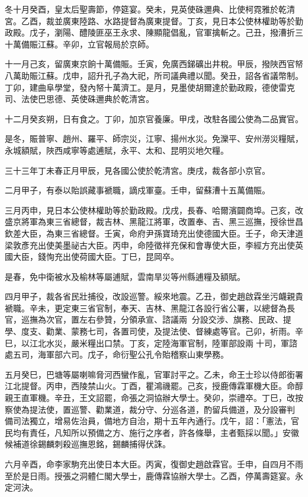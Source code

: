 \begin{pinyinscope}
冬十月癸酉，皇太后聖壽節，停筵宴。癸未，見英使硃邇典、比使柯霓雅於乾清宮。乙酉，裁並廣東陸路、水路提督為廣東提督。丁亥，見日本公使林權助等於勤政殿。戊子，瀏陽、醴陵匪巫王永求、陳顯龍倡亂，官軍擒斬之。己丑，撥漕折三十萬備賑江蘇。辛卯，立官報局於京師。

十一月己亥，留廣東京餉十萬備賑。壬寅，免廣西銻礦出井稅。甲辰，撥陜西官帑八萬助賑江蘇。戊申，詔升孔子為大祀，所司議典禮以聞。癸丑，詔各省議幣制。丁卯，建曲阜學堂，發內帑十萬濟工。是月，見墨使胡爾達於勤政殿，德使雷克司、法使巴思德、英使硃邇典於乾清宮。

十二月癸亥朔，日有食之。丁卯，加京官養廉。甲戌，改駐各國公使為二品實官。

是冬，賑普寧、趙州、羅平、師宗災，江寧、揚州水災。免灤平、安州澇災糧賦，永城額賦，陜西咸寧等處逋賦，永平、太和、昆明災地欠糧。

三十三年丁未春正月甲辰，見各國公使於乾清宮。庚戌，裁各部小京官。

二月甲子，有泰以貽誤藏事褫職，謫戍軍臺。壬申，留蘇漕十五萬備賑。

三月丙申，見日本公使林權助等於勤政殿。戊戌，長春、哈爾濱闢商埠。己亥，改盛京將軍為東三省總督，裁吉林、黑龍江將軍，改置奉、吉、黑三巡撫，授徐世昌欽差大臣，為東三省總督。壬寅，命府尹孫寶琦充出使德國大臣。壬子，命天津道梁敦彥充出使美墨祕古大臣。丙申，命陸徵祥充保和會專使大臣，李經方充出使英國大臣，錢恂充出使荷國大臣。丁巳，昆岡卒。

是春，免中衛被水及榆林等屬逋賦，雲南旱災等州縣逋糧及額賦。

四月甲子，裁各省民壯捕役，改設巡警。綏來地震。乙丑，御史趙啟霖坐污衊親貴褫職。辛未，更定東三省官制，奉天、吉林、黑龍江各設行省公署，以總督為長官，巡撫為次官，置左右參贊，分領承宣、諮議兩，分設交涉、旗務、民政、提學、度支、勸業、蒙務七司，各置司使，及提法使、督練處等官。己卯，祈雨。辛巳，以江北水災，嚴米糧出口禁。丁亥，定陸海軍官制，陸軍部設兩十司，軍諮處五司，海軍部六司。戊子，命衍聖公孔令貽稽察山東學務。

五月癸巳，巴塘等屬喇嘛脅河西蠻作亂，官軍討平之。乙未，命王士珍以侍郎銜署江北提督。丙申，西陵禁山火。丁酉，瞿鴻禨罷。己亥，授鹿傳霖軍機大臣。命醇親王直軍機。辛丑，王文詔罷，命張之洞協辦大學士。癸卯，崇禮卒。丁巳，改按察使為提法使，置巡警、勸業道，裁分守、分巡各道，酌留兵備道，及分設審判，備司法獨立，增易佐治員，備地方自治，期十五年內通行。戊午，詔：「憲法，官民均有責任，凡知所以預備之方、施行之序者，許各條舉，主者甄採以聞。」安徽候補道徐錫麟刺殺巡撫恩銘，錫麟捕得伏誅。

六月辛酉，命李家駒充出使日本大臣。丙寅，復御史趙啟霖官。壬申，自四月不雨至於是日雨。授張之洞體仁閣大學士，鹿傳霖協辦大學士。乙酉，停萬壽筵宴。永定河決。


\end{pinyinscope}
